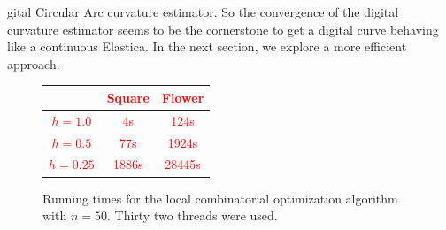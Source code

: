 \documentclass[smallextended]{svjour3}       %
\newcommand{\revision}[1]{\textcolor{red}{#1}}
\begin{document}
gital Circular Arc curvature estimator. So the convergence of the digital curvature
estimator seems to be the cornerstone to get a digital curve behaving like a continuous Elastica.  In the next section,
we explore a more efficient approach.

\begin{figure}
	\center
	\captionsetup{type=table}	
	\revision{
	\begin{tabular}{|c|c|c|}
	\hline
	& Square & Flower \\
	\hline
	$h=1.0$ & 4s & 124s \\
	\hline
	$h=0.5$ & 77s & 1924s\\
	\hline
	$h=0.25$ & 1886s & 28445s\\
	\hline
	\end{tabular}
	}
	\caption{Running times for the local combinatorial optimization algorithm with $n=50$. Thirty two threads were used.}
	\label{tab:summary-local-comb-rtime}
\end{figure}
\end{document}
